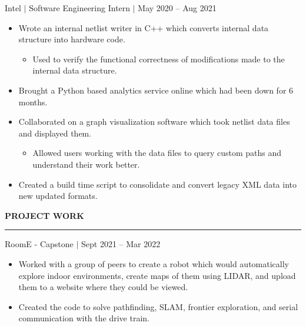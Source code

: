 \documentclass[12pt]{article}
\newcommand{\sectionRule}{\textcolor{gray}{\rule{7.27in}{0.02cm}}}
\newcommand{\sectionTxt}[1]{\noindent\textbf{#1}\\}
\newcommand{\textDate}[3]{\noindent#1 $|$ #2 $|$ {\color{textGray} #3}}
\newcommand{\projText}[2]{\noindent#1 $|$ {\color{textGray} #2}}
\begin{document}
    \textDate{Intel}{Software Engineering Intern}{May 2020 -- Aug 2021}
    \begin{small}
        \begin{itemize}
            \itemsep0em 
            \item {Wrote an internal netlist writer in C++ which converts internal data structure into hardware code.}
                \begin{itemize}[label=$\circ$,topsep=-5px,partopsep=0px]
                    \itemsep0em 
                    \item {Used to verify the functional correctness of modifications made to the internal data structure.}
                \end{itemize}
            \item {Brought a Python based analytics service online which had been down for 6 months.}
            \item {Collaborated on a graph visualization software which took netlist data files and displayed them.}
                \begin{itemize}[label=$\circ$,topsep=-5px,partopsep=0px]
                    \itemsep0em 
                    \item {Allowed users working with the data files to query custom paths and understand their work better.}
                \end{itemize}
            \item {Created a build time script to consolidate and convert legacy XML data into new updated formats.}
        \end{itemize}
    \end{small}

    \sectionTxt{PROJECT WORK}
    \sectionRule

    \projText{RoomE - Capstone}{Sept 2021 -- Mar 2022}
    \begin{small}
        \begin{itemize}
            \itemsep0em 
            \item {Worked with a group of peers to create a robot which would automatically explore indoor environments, create maps of them using LIDAR, and upload them to a website where they could be viewed.}
            \item {Created the code to solve pathfinding, SLAM, frontier exploration, and serial communication with the drive train. }
        \end{itemize}
    \end{small}
\end{document}
